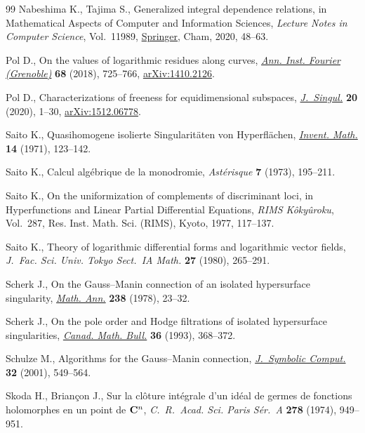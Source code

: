 \documentclass[pdftex]{sigma}%
\numberwithin{equation}{section}
\begin{document}
\begin{thebibliography}{99}
Nabeshima K., Tajima S., Generalized integral dependence relations, in
 Mathematical Aspects of Computer and Information Sciences, \textit{Lecture
 Notes in Computer Science}, Vol.~11989, \href{https://doi.org/10.1007/978-3-030-43120-4_6}{Springer}, Cham, 2020, 48--63.

Pol D., On the values of logarithmic residues along curves, \href{https://doi.org/10.5802/aif.3176}{\textit{Ann. Inst.
 Fourier (Grenoble)}} \textbf{68} (2018), 725--766, \href{https://arxiv.org/abs/1410.2126}{arXiv:1410.2126}.

Pol D., Characterizations of freeness for equidimensional subspaces,
 \href{https://doi.org/10.5427/jsing.2020.20a}{\textit{J.~Singul.}} \textbf{20} (2020), 1--30, \href{https://arxiv.org/abs/1512.06778}{arXiv:1512.06778}.

Saito K., Quasihomogene isolierte {S}ingularit\"aten von {H}yperfl\"achen,
 \href{https://doi.org/10.1007/BF01405360}{\textit{Invent. Math.}} \textbf{14} (1971), 123--142.

Saito K., Calcul alg\'ebrique de la monodromie, \textit{Ast\'erisque}
 \textbf{7} (1973), 195--211.

Saito K., On the uniformization of complements of discriminant loci, in
 Hyperfunctions and Linear Partial Differential Equations, \textit{RIMS
 K\^oky\^uroku}, Vol.~287, Res. Inst. Math. Sci. (RIMS), Kyoto, 1977,
 117--137.

Saito K., Theory of logarithmic differential forms and logarithmic vector
 fields, \textit{J.~Fac. Sci. Univ. Tokyo Sect.~IA Math.} \textbf{27} (1980),
 265--291.

Scherk J., On the {G}auss--{M}anin connection of an isolated hypersurface
 singularity, \href{https://doi.org/10.1007/BF01351450}{\textit{Math. Ann.}} \textbf{238} (1978), 23--32.

Scherk J., On the pole order and {H}odge filtrations of isolated hypersurface
 singularities, \href{https://doi.org/10.4153/CMB-1993-050-9}{\textit{Canad. Math. Bull.}} \textbf{36} (1993), 368--372.

Schulze M., Algorithms for the {G}auss--{M}anin connection, \href{https://doi.org/10.1006/jsco.2001.0482}{\textit{J.~Symbolic
 Comput.}} \textbf{32} (2001), 549--564.

Skoda H., Brian\c{c}on J., Sur la cl\^oture int\'egrale d'un id\'eal de germes
 de fonctions holomorphes en un point de {${\bf C}^{n}$}, \textit{C.~R.~Acad.
 Sci. Paris S\'er.~A} \textbf{278} (1974), 949--951.


\end{thebibliography}
\end{document}
